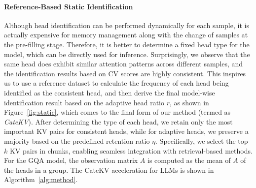 

\paragraph{Reference-Based Static Identification}
Although head identification can be performed dynamically for each sample, it is actually expensive for memory management along with the change of samples at the pre-filling stage. Therefore, it is better to determine a fixed head type for the model, which can be directly used for inference. Surprisingly, we observe that the same head does exhibit similar attention patterns across different samples, and the identification results based on CV scores are highly consistent. This inspires us to use a reference dataset to calculate the frequency of each head being identified as the consistent head, and then derive the final model-wise identification result based on the adaptive head ratio $r$, as shown in Figure~\ref{fig:static}, which comes to the final form of our method (termed as \emph{CateKV}). After determining the type of each head, we retain only the most important KV pairs for consistent heads, while for adaptive heads, we preserve a majority based on the predefined retention ratio \( \eta \). Specifically,
we select the top-$k$ KV pairs in chunks, enabling seamless integration with retrieval-based methods. For the GQA model, the observation matrix \( A \) is computed as the mean of \( A \) of the heads in a group. 
The CateKV acceleration for LLMs is shown in Algorithm~\ref{alg:method}.


